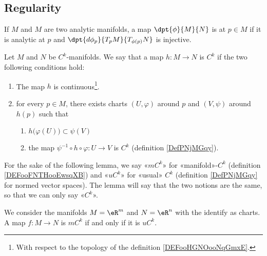\subsection{Regularity}

\begin{definition}
    If $M$ and $M$ are two analytic manifolds, a map $\dpt{\phi}{M}{N}$ is \label{PgDefRegular} at $p\in M$ if it is analytic at $p$ and $\dpt{d\phi_p}{T_pM}{T_{\phi(p)}N}$ is injective.
\end{definition}

\begin{definition}        \label{DEFooFNTHooEwsqXB}
    Let \( M\) and \( N\) be \( C^k\)-manifolds. We say that a map \( h\colon M\to N\) is \( C^k\) if the two following conditions hold:
    \begin{enumerate}
        \item
            The map \( h\) is continuous\footnote{With respect to the topology of the definition \ref{DEFooHGNOooNqGmxE}.}.
        \item
            for every \( p\in M\), there exists charts \( (U,\varphi)\) around \( p\) and \( (V,\psi)\) around \( h(p)\) such that
            \begin{enumerate}
                \item
                    \( h\big( \varphi(U) \big)\subset\psi(V)\)
                \item       \label{SUBITEMooXQFUooRxMVnw}
                    the map \( \psi^{-1}\circ h\circ\varphi\colon U \to V \) is \( C^k\) (definition \ref{DefPNjMGqy}).
            \end{enumerate}
    \end{enumerate}
\end{definition}

For the sake of the following lemma, we say «\( mC^k\)» for «manifold»-\( C^k\) (definition \ref{DEFooFNTHooEwsqXB}) and «\( uC^k\)» for «usual» \( C^k\) (definition \ref{DefPNjMGqy} for normed vector spaces). The lemma will say that the two notions are the same, so that we can only say «\( C^k\)».
\begin{lemma}
    We consider the manifolds \( M=\eR^m\) and \( N=\eR^n\) with the identify as charts. A map \( f\colon M\to N\) is \( mC^k\) if and only if it is \( uC^k\).
\end{lemma}

